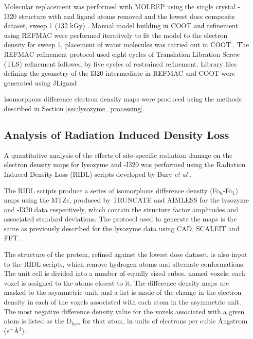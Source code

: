 Molecular replacement was performed with MOLREP using the single crystal \atpdx -I320 structure with and ligand atoms removed and the lowest dose composite dataset, sweep 1 (132 kGy) \cite{Vagin1997}. Manual model building in COOT and refinement using REFMAC were performed iteratively to fit the model to the electron density for sweep 1, placement of water molecules was carried out in COOT \cite{Emsley2010,Murshudov1997}. The REFMAC refinement protocol used eight cycles of Translation Libration Screw (TLS) refinement followed by five cycles of restrained refinement. Library files defining the geometry of the I320 intermediate in REFMAC and COOT were generated using JLigand \cite{Lebedev2012}. 

Isomorphous difference electron density maps were produced using the methods described in Section \ref{sec:lysozyme_processing}. 
\newpage
\subsection{Analysis of Radiation Induced Density Loss}
A quantitative analysis of the effects of site-specific radiation damage on the electron density maps for lysozyme and \atpdx -I320 was performed using the Radiation Induced Density Loss (RIDL) scripts developed by Bury \textit{et al} \cite{Bury2016}.  
  
The RIDL scripts produce a series of isomorphous difference density (Fo$_n$-Fo$_1$) maps using the MTZs, produced by TRUNCATE and AIMLESS for the lysozyme and \atpdx -I320 data respectively, which contain the structure factor amplitudes and associated standard deviations. The protocol used to generate the maps is the same as previously described for the lysozyme data using CAD, SCALEIT and FFT \cite{Bury2016,Howell1992,Ten1973}. 

The structure of the protein, refined against the lowest dose dataset, is also input to the RIDL scripts, which remove hydrogen atoms and alternate conformations. The unit cell is divided into a number of equally sized cubes, named voxels; each voxel is assigned to the atoms closest to it. The difference density maps are masked to the asymmetric unit, and a list is made of the change in the electron density in each of the voxels associated with each atom in the asymmetric unit. The most negative difference density value for the voxels associated with a given atom is listed as the D$_{loss}$ for that atom, in units of electrons per cubic {\AA}ngstrom ($e^{-}$\si{\angstrom}$^3$). 

